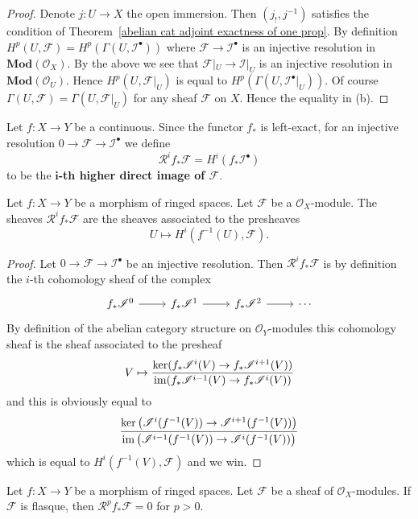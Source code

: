 \begin{proof}
Denote $j:U\to X$ the open immersion. Then $(j_!,j^{-1})$ satisfies the condition of Theorem~\ref{abelian cat adjoint exactness of one prop}. By definition $H^p(U,\mathscr{F})=H^p(\Gamma(U,\mathscr{I}^\bullet))$ where $\mathscr{F}\to\mathscr{I}^\bullet$ is an injective resolution in $\mathbf{Mod}(\mathcal{O}_X)$. By the above we see that $\mathscr{F}|_U\to\mathscr{I}|_U$ is an injective resolution in $\mathbf{Mod}(\mathcal{O}_U)$. Hence $H^p(U,\mathscr{F}|_U)$ is equal to $H^p(\Gamma(U,\mathscr{I}^\bullet|_U))$. Of course $\Gamma(U,\mathscr{F})=\Gamma(U,\mathscr{F}|_U)$ for any sheaf $\mathscr{F}$ on $X$. Hence the equality in (b).
\end{proof}
Let $f:X\to Y$ be a continuous. Since the functor $f_*$ is left-exact, for an injective resolution $0\to\mathscr{F}\to\mathscr{I}^\bullet$ we define 
\[\mathcal{R}^if_*\mathscr{F}=H^i(f_*\mathscr{I}^\bullet)\]
to be the \textbf{$\bm{i}$-th higher direct image of $\mathscr{F}$}.
\begin{proposition}\label{push derive char}
Let $f:X\to Y$ be a morphism of ringed spaces. Let $\mathscr{F}$ be a $\mathscr{O}_X$-module. The sheaves $\mathcal{R}^if_*\mathscr{F}$ are the sheaves associated to the presheaves
\[U\mapsto H^i(f^{-1}(U),\mathscr{F}).\]
\end{proposition}
\begin{proof}
Let $0\to\mathscr{F}\to\mathscr{I}^\bullet$ be an injective resolution. Then $\mathcal{R}^if_*\mathscr{F}$ is by definition the $i$-th cohomology sheaf of the complex
\[\begin{tikzcd}
f_*\mathscr{I}^0\ar[r]&f_*\mathscr{I}^1\ar[r]&f_*\mathscr{I}^2\ar[r]&\cdots
\end{tikzcd}\]
By definition of the abelian category structure on $\mathscr{O}_Y$-modules this cohomology sheaf is the sheaf associated to the presheaf
\[V\mapsto\frac{\operatorname{ker}(f_*\mathscr{I}^i(V)\to f_*\mathscr{I}^{i+1}(V))}{\operatorname{im} (f_*\mathscr{I}^{i-1}(V)\to f_*\mathscr{I}^{i}(V))}\]
and this is obviously equal to
\[\frac{\operatorname{ker}\big(\mathscr{I}^i(f^{-1}(V))\to\mathscr{I}^{i+1}(f^{-1}(V))\big)}{\operatorname{im}\big(\mathscr{I}^{i-1}(f^{-1}(V))\to\mathscr{I}^{i}(f^{-1}(V))\big)}\]
which is equal to $H^i(f^{-1}(V),\mathscr{F})$ and we win.
\end{proof}
\begin{corollary}
Let $f:X\to Y$ be a morphism of ringed spaces. Let $\mathscr{F}$ be a sheaf of $\mathscr{O}_X$-modules. If $\mathscr{F}$ is flasque, then $\mathcal{R}^pf_*\mathscr{F}=0$ for $p>0$.
\end{corollary}
